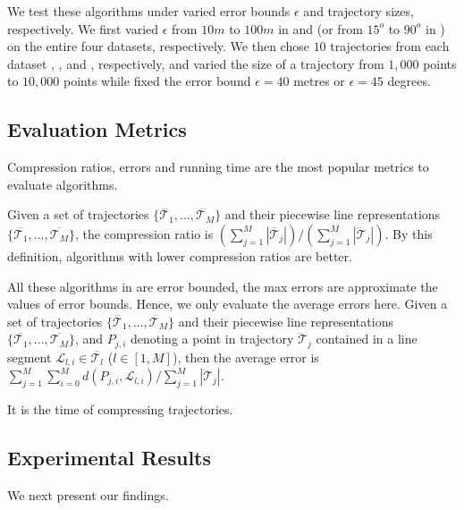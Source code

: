 We test these algorithms under varied error bounds $\epsilon$ and trajectory sizes, respectively. We first varied $\epsilon$ from $10m$ to $100m$ in \ped and \sed (or from $15^o$ to $90^o$ in \dad) on the entire four datasets, respectively. We then chose $10$ trajectories from each dataset \taxi, \ucar, \geolife and \mopsi, respectively, and varied the size  of a trajectory from $1,000$ points to $10,000$ points while fixed the error bound $\epsilon=40$ metres or $\epsilon=45$ degrees.

\subsection{Evaluation Metrics}
Compression ratios, errors and running time are the most popular metrics to evaluate \lsa algorithms.

Given a set of trajectories $\{\dddot{\mathcal{T}_1}, \ldots, \dddot{\mathcal{T}_M}\}$ and their piecewise line representations $\{\overline{\mathcal{T}_1}, \ldots, \overline{\mathcal{T}_M}\}$,
the compression ratio is $(\sum_{j=1}^{M} |\overline{\mathcal{T}}_j |)/(\sum_{j=1}^{M} |\dddot{\mathcal{T}}_j |)$.
By this definition, algorithms with lower compression ratios are better.

All these algorithms in  are error bounded, \ie the max errors are approximate the values of error bounds. Hence, we only evaluate the average errors here. Given a set of trajectories $\{\dddot{\mathcal{T}_1}, \ldots, \dddot{\mathcal{T}_M}\}$ and their piecewise line representations
$\{\overline{\mathcal{T}_1}, \ldots, \overline{\mathcal{T}_M}\}$, and $P_{j,i}$ denoting
a point in trajectory $\dddot{\mathcal{T}}_j$ contained in a line segment $\mathcal{L}_{l,i}\in\overline{\mathcal{T}_l}$ ($l\in[1,M]$),
then the average error is $\sum_{j=1}^{M}\sum_{i=0}^{M} d(P_{j,i},
\mathcal{L}_{l,i})/\sum_{j=1}^{M}{|\dddot{\mathcal{T}}_j |}$.

It is the time of compressing trajectories.

\subsection{Experimental Results}
We next present our findings.


